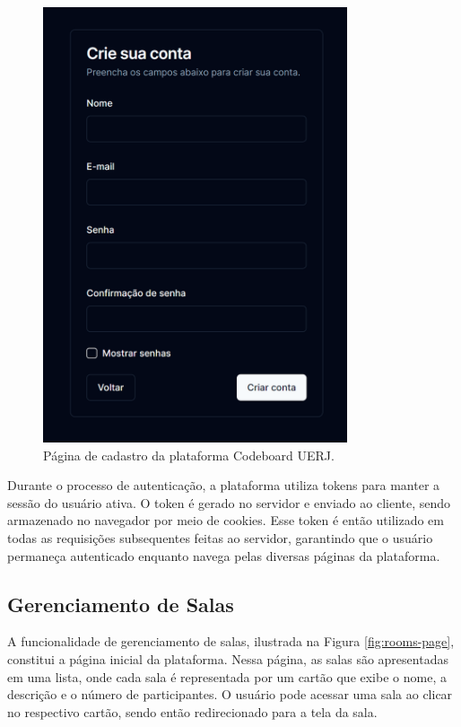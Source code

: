 \begin{figure}[H]
    \centering
    \caption{Página de cadastro da plataforma Codeboard UERJ.}
    \label{fig:signup-page}
    \includegraphics[width=0.8\textwidth]{assets/codeboard/signup-page.png}
\end{figure}

Durante o processo de autenticação, a plataforma utiliza tokens para manter a sessão do usuário ativa. O token é gerado no servidor e enviado ao cliente, sendo armazenado no navegador por meio de cookies. Esse token é então utilizado em todas as requisições subsequentes feitas ao servidor, garantindo que o usuário permaneça autenticado enquanto navega pelas diversas páginas da plataforma.

\subsection{Gerenciamento de Salas}

A funcionalidade de gerenciamento de salas, ilustrada na Figura \ref{fig:rooms-page}, constitui a página inicial da plataforma. Nessa página, as salas são apresentadas em uma lista, onde cada sala é representada por um cartão que exibe o nome, a descrição e o número de participantes. O usuário pode acessar uma sala ao clicar no respectivo cartão, sendo então redirecionado para a tela da sala.


